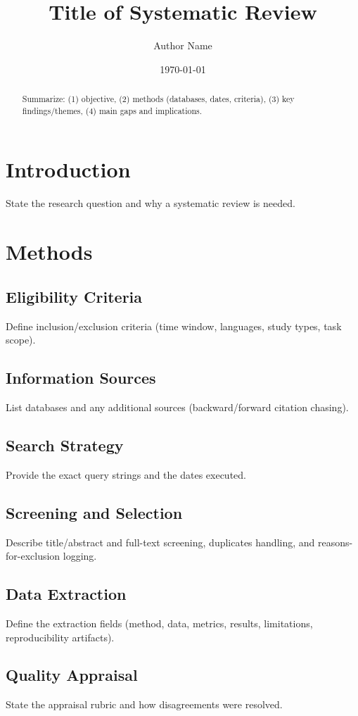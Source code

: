 \documentclass[11pt]{article}
\title{Title of Systematic Review}
\author{Author Name}
\date{\today}
\begin{document}
\maketitle

\begin{abstract}
Summarize: (1) objective, (2) methods (databases, dates, criteria), (3) key findings/themes, (4) main gaps and implications.
\end{abstract}

\section{Introduction}
State the research question and why a systematic review is needed.

\section{Methods}

\subsection{Eligibility Criteria}
Define inclusion/exclusion criteria (time window, languages, study types, task scope).

\subsection{Information Sources}
List databases and any additional sources (backward/forward citation chasing).

\subsection{Search Strategy}
Provide the exact query strings and the dates executed.

\subsection{Screening and Selection}
Describe title/abstract and full-text screening, duplicates handling, and reasons-for-exclusion logging.

\subsection{Data Extraction}
Define the extraction fields (method, data, metrics, results, limitations, reproducibility artifacts).

\subsection{Quality Appraisal}
State the appraisal rubric and how disagreements were resolved.
\end{document}
